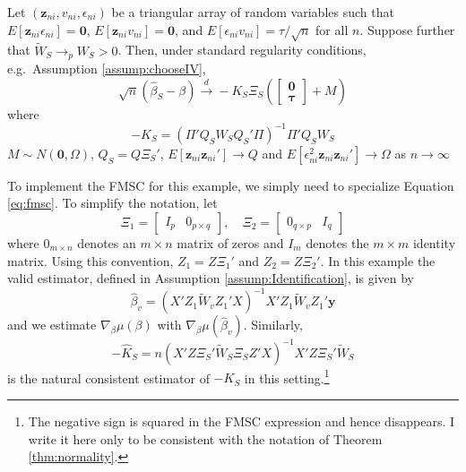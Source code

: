\begin{thm}
\label{thm:chooseIV} 
Let $(\mathbf{z}_{ni}, v_{ni}, \epsilon_{ni})$ be a triangular array of random variables such that $E[\mathbf{z}_{ni} \epsilon_{ni}]=\mathbf{0}$, $E[\mathbf{z}_{ni} v_{ni}]=\mathbf{0}$, and $E[\epsilon_{ni}v_{ni}] = \tau/\sqrt{n}$ for all $n$. Suppose further that $\widetilde{W}_S \rightarrow_p W_S >0$. 
Then, under standard regularity conditions, e.g.\ Assumption \ref{assump:chooseIV}, 
$$\sqrt{n}\left(\widehat{\beta}_S - \beta \right) \overset{d}{\rightarrow} -K_S \Xi_S \left(\left[\begin{array}
           {c} \mathbf{0} \\ \boldsymbol{\tau}
         \end{array}\right] + M \right)$$
where
         $$-K_S = \left(\Pi' Q_S W_S Q_S'\Pi\right)^{-1} \Pi'Q_SW_S$$
$M \sim N(\mathbf{0}, \Omega)$, $Q_S = Q \Xi_S'$, $E[\mathbf{z}_{ni} \mathbf{z}_{ni}'] \rightarrow Q$ and $E[\epsilon_{ni}^2 \mathbf{z}_{ni} \mathbf{z}_{ni}'] \rightarrow \Omega$ as $n\rightarrow \infty$
\end{thm}
To implement the FMSC for this example, we simply need to specialize Equation \ref{eq:fmsc}.
To simplify the notation, let
\begin{equation}
\label{eq:xi12}
\Xi_1 = \left[\begin{array}{cc} I_{p} & 0_{p \times q}  \end{array}\right], \quad
    \Xi_2 = \left[ \begin{array}{cc}
              0_{q \times p}& I_{q}
            \end{array}\right]	
\end{equation}
where $0_{m\times n}$ denotes an $m\times n$ matrix of zeros and $I_m$ denotes the $m\times m$ identity matrix.
Using this convention, $Z_1 = Z \Xi_1'$ and $Z_2 = Z \Xi_2'$.
In this example the valid estimator, defined in Assumption \ref{assump:Identification}, is given by
\begin{equation}
\label{eq:betav}
\widehat{\beta}_v = \left(X'Z_1 \widetilde{W}_v Z_1' X\right)^{-1}X'Z_1 \widetilde{W}_v Z_1' \mathbf{y}	
\end{equation}
and we estimate $\nabla_\beta \mu(\beta)$ with $\nabla_\beta \mu(\widehat{\beta}_v)$.  
Similarly, 
$$-\widehat{K}_S = n\left(X'Z \Xi_S' \widetilde{W}_S \Xi_S Z' X\right)^{-1}X' Z \Xi_S' \widetilde{W}_S$$
is the natural consistent estimator of $-K_S$ in this setting.\footnote{The negative sign is squared in the FMSC expression and hence disappears. I write it here only to be consistent with the notation of Theorem \ref{thm:normality}.}
